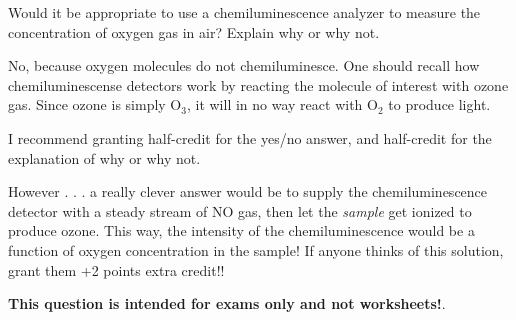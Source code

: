 

Would it be appropriate to use a chemiluminescence analyzer to measure the concentration of oxygen gas in air?  Explain why or why not.







No, because oxygen molecules do not chemiluminesce.  One should recall how chemiluminescense detectors work by reacting the molecule of interest with ozone gas.  Since ozone is simply O$_{3}$, it will in no way react with O$_{2}$ to produce light.

\vskip 10pt

I recommend granting half-credit for the yes/no answer, and half-credit for the explanation of why or why not.

\vskip 10pt

However . . . a really clever answer would be to supply the chemiluminescence detector with a steady stream of NO gas, then let the {\it sample} get ionized to produce ozone.  This way, the intensity of the chemiluminescence would be a function of oxygen concentration in the sample!  If anyone thinks of this solution, grant them +2 points extra credit!!







{\bf This question is intended for exams only and not worksheets!}.



